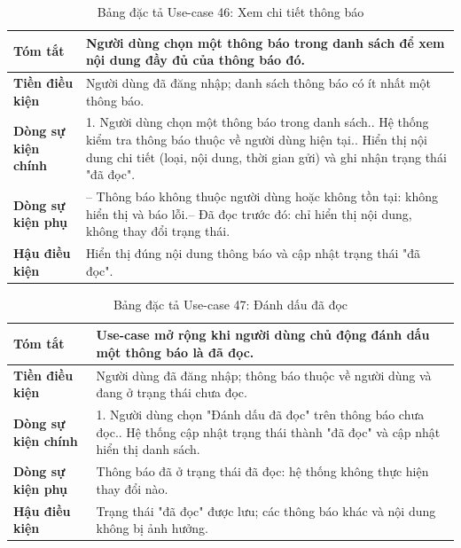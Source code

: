 \documentclass[a4paper,12pt]{article}
\begin{document}
\begin{table}[H]\centering\footnotesize
\begin{tabularx}{\textwidth}{|L{3.2cm}|Y|}
\hline \textbf{Tóm tắt} & Người dùng chọn một thông báo trong danh sách để xem nội dung đầy đủ của thông báo đó. \\ \hline
\textbf{Tiền điều kiện} & Người dùng đã đăng nhập; danh sách thông báo có ít nhất một thông báo. \\ \hline
\textbf{Dòng sự kiện chính} & 1. Người dùng chọn một thông báo trong danh sách.. Hệ thống kiểm tra thông báo thuộc về người dùng hiện tại.. Hiển thị nội dung chi tiết (loại, nội dung, thời gian gửi) và ghi nhận trạng thái "đã đọc". \\ \hline
\textbf{Dòng sự kiện phụ} & -- Thông báo không thuộc người dùng hoặc không tồn tại: không hiển thị và báo lỗi.\newline -- Đã đọc trước đó: chỉ hiển thị nội dung, không thay đổi trạng thái. \\ \hline
\textbf{Hậu điều kiện} & Hiển thị đúng nội dung thông báo và cập nhật trạng thái "đã đọc". \\ \hline
\end{tabularx}
\caption{Bảng đặc tả Use-case 46: Xem chi tiết thông báo}
\end{table}

\begin{table}[H]\centering\footnotesize
\begin{tabularx}{\textwidth}{|L{3.2cm}|Y|}
\hline \textbf{Tóm tắt} & Use-case mở rộng khi người dùng chủ động đánh dấu một thông báo là đã đọc. \\ \hline
\textbf{Tiền điều kiện} & Người dùng đã đăng nhập; thông báo thuộc về người dùng và đang ở trạng thái chưa đọc. \\ \hline
\textbf{Dòng sự kiện chính} & 1. Người dùng chọn "Đánh dấu đã đọc" trên thông báo chưa đọc.. Hệ thống cập nhật trạng thái thành "đã đọc" và cập nhật hiển thị danh sách. \\ \hline
\textbf{Dòng sự kiện phụ} & Thông báo đã ở trạng thái đã đọc: hệ thống không thực hiện thay đổi nào. \\ \hline
\textbf{Hậu điều kiện} & Trạng thái "đã đọc" được lưu; các thông báo khác và nội dung không bị ảnh hưởng. \\ \hline
\end{tabularx}
\caption{Bảng đặc tả Use-case 47: Đánh dấu đã đọc}
\end{table}
\end{document}
